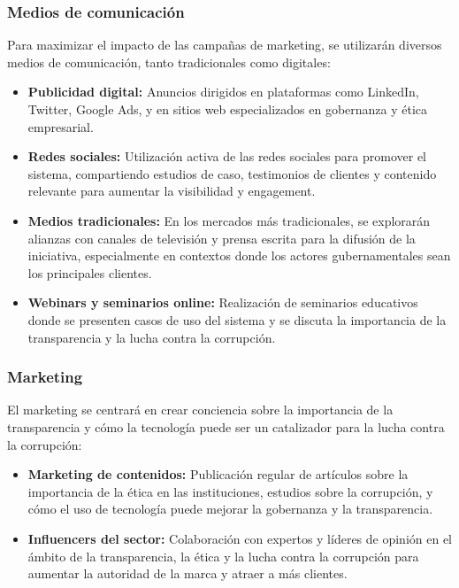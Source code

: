 \documentclass[a4paper,12pt]{article}
\begin{document}
\subsubsection{Medios de comunicación}
Para maximizar el impacto de las campañas de marketing, se utilizarán diversos medios de comunicación, tanto tradicionales como digitales:

\begin{itemize}
    \item \textbf{Publicidad digital:} Anuncios dirigidos en plataformas como LinkedIn, Twitter, Google Ads, y en sitios web especializados en gobernanza y ética empresarial.
    \item \textbf{Redes sociales:} Utilización activa de las redes sociales para promover el sistema, compartiendo estudios de caso, testimonios de clientes y contenido relevante para aumentar la visibilidad y engagement.
    \item \textbf{Medios tradicionales:} En los mercados más tradicionales, se explorarán alianzas con canales de televisión y prensa escrita para la difusión de la iniciativa, especialmente en contextos donde los actores gubernamentales sean los principales clientes.
    \item \textbf{Webinars y seminarios online:} Realización de seminarios educativos donde se presenten casos de uso del sistema y se discuta la importancia de la transparencia y la lucha contra la corrupción.
\end{itemize}

\subsubsection{Marketing}
El marketing se centrará en crear conciencia sobre la importancia de la transparencia y cómo la tecnología puede ser un catalizador para la lucha contra la corrupción:

\begin{itemize}
    \item \textbf{Marketing de contenidos:} Publicación regular de artículos sobre la importancia de la ética en las instituciones, estudios sobre la corrupción, y cómo el uso de tecnología puede mejorar la gobernanza y la transparencia.
    \item \textbf{Influencers del sector:} Colaboración con expertos y líderes de opinión en el ámbito de la transparencia, la ética y la lucha contra la corrupción para aumentar la autoridad de la marca y atraer a más clientes.
\end{itemize}
\end{document}

